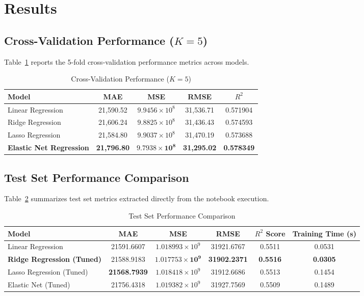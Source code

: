 \documentclass[12pt,a4paper]{article}
\begin{document}
\section{Results}

\subsection{Cross-Validation Performance ($K = 5$)}
Table~\ref{tab:cv_perf} reports the 5-fold cross-validation performance metrics across models.

\begin{table}[H]
\centering
\caption{Cross-Validation Performance ($K = 5$)}
\label{tab:cv_perf}
\vspace{0.2cm}
\begin{tabular}{lcccc}
\toprule
\textbf{Model} & \textbf{MAE} & \textbf{MSE} & \textbf{RMSE} & \textbf{$R^2$} \\
\midrule
Linear Regression & 21,590.52 & $9.9456 \times 10^8$ & 31,536.71 & 0.571904 \\
Ridge Regression & 21,606.24 & $9.8825 \times 10^8$ & 31,436.43 & 0.574593 \\
Lasso Regression & 21,584.80 & $9.9037 \times 10^8$ & 31,470.19 & 0.573688 \\
\textbf{Elastic Net Regression} & \textbf{21,796.80} & $\mathbf{9.7938 \times 10^8}$ & \textbf{31,295.02} & \textbf{0.578349} \\
\bottomrule
\end{tabular}
\end{table}

\subsection{Test Set Performance Comparison}
Table~\ref{tab:test_perf} summarizes test set metrics extracted directly from the notebook execution.

\begin{table}[H]
\centering
\caption{Test Set Performance Comparison}
\label{tab:test_perf}
\vspace{0.2cm}
\begin{tabular}{lccccc}
\toprule
\textbf{Model} & \textbf{MAE} & \textbf{MSE} & \textbf{RMSE} & \textbf{$R^2$ Score} & \textbf{Training Time (s)} \\
\midrule
Linear Regression & 21591.6607 & $1.018993 \times 10^9$ & 31921.6767 & 0.5511 & 0.0531 \\
\textbf{Ridge Regression (Tuned)} & 21588.9183 & $\mathbf{1.017753 \times 10^9}$ & \textbf{31902.2371} & \textbf{0.5516} & \textbf{0.0305} \\
Lasso Regression (Tuned) & \textbf{21568.7939} & $1.018418 \times 10^9$ & 31912.6686 & 0.5513 & 0.1454 \\
Elastic Net (Tuned) & 21756.4318 & $1.019382 \times 10^9$ & 31927.7569 & 0.5509 & 0.1489 \\
\bottomrule
\end{tabular}
\end{table}
\end{document}
